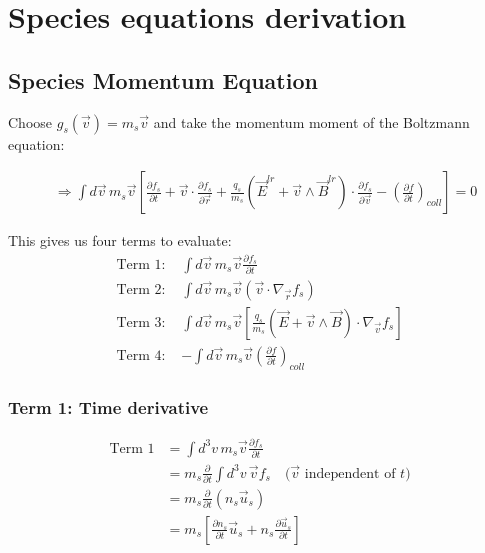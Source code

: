 \chapter{Species equations derivation}
\section{Species Momentum Equation}\label{sec:Species Momentum Equation}

Choose $g_s(\vec{v}) = m_s \vec{v}$ and take the momentum moment of the Boltzmann equation:

\begin{align*}
&\Rightarrow \int d\vec{v} \, m_s \vec{v} \left[\frac{\partial f_s}{\partial t}+ \vec{v} \cdot \frac{\partial f_s}{\partial \vec{r}} + \frac{q_s}{m_s}(\vec{E}^{lr} + \vec{v} \wedge \vec{B}^{lr}) \cdot \frac{\partial f_s}{\partial \vec{v}} - \left(\frac{\partial f}{\partial t}\right)_{coll}\right] = 0
\end{align*}

This gives us four terms to evaluate:
\begin{align*}
\text{Term 1: } & \int d\vec{v} \, m_s \vec{v} \frac{\partial f_s}{\partial t} \\
\text{Term 2: } & \int d\vec{v} \, m_s \vec{v} (\vec{v} \cdot \nabla_{\vec{r}} f_s) \\
\text{Term 3: } & \int d\vec{v} \, m_s \vec{v} \left[\frac{q_s}{m_s}(\vec{E} + \vec{v} \wedge \vec{B}) \cdot \nabla_{\vec{v}} f_s\right] \\
\text{Term 4: } & -\int d\vec{v} \, m_s \vec{v} \left(\frac{\partial f}{\partial t}\right)_{coll}
\end{align*}

\subsection{Term 1: Time derivative}

\begin{align*}
\text{Term 1} &= \int d^3v \, m_s \vec{v} \frac{\partial f_s}{\partial t}  \\
&= m_s \frac{\partial}{\partial t} \int d^3v \, \vec{v} f_s \quad \text{($\vec{v}$ independent of $t$)}  \\
&= m_s \frac{\partial}{\partial t} (n_s \vec{u}_s)  \\
&= m_s \left[ \frac{\partial n_s}{\partial t} \vec{u}_s + n_s \frac{\partial \vec{u}_s}{\partial t} \right]
\end{align*}

